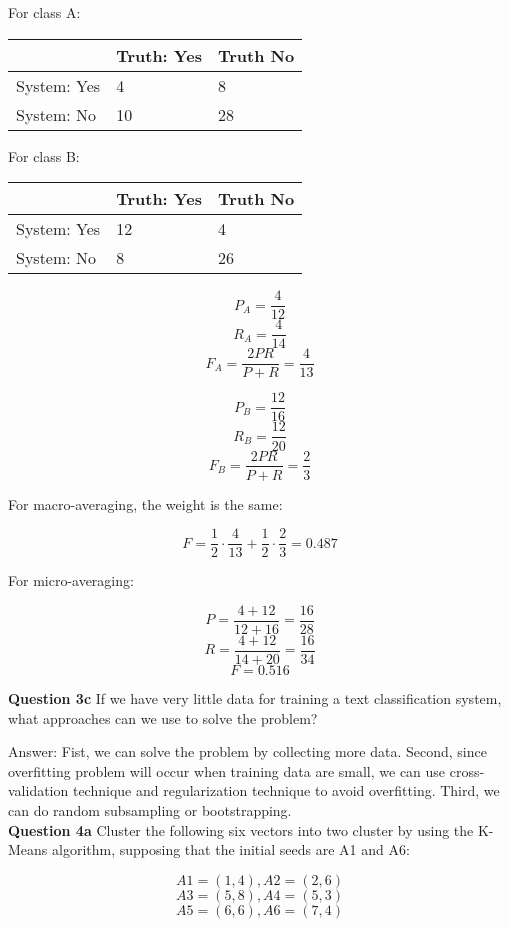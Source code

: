 \documentclass[11pt,a4paper]{report}
\begin{document}
\begin{multicols*}{2}
\noindent For class A:
\begin{center}
\begin{tabular}{| l | l | l |}
\hline
             & Truth: Yes & Truth No \\ \hline
System: Yes  & 4  & 8 \\ \hline
System: No   & 10 & 28\\ \hline
\end{tabular}
\end{center}

\noindent For class B:
\begin{center}
\begin{tabular}{| l | l | l |}
\hline
             & Truth: Yes & Truth No \\ \hline
System: Yes  & 12 & 4  \\ \hline
System: No   & 8  & 26 \\ \hline
\end{tabular}
\end{center}

$$P_A = \frac{4}{12}$$
$$R_A = \frac{4}{14}$$
$$F_A = \frac{2PR}{P+R} = \frac{4}{13}$$

$$P_B = \frac{12}{16}$$
$$R_B = \frac{12}{20}$$
$$F_B = \frac{2PR}{P+R} = \frac{2}{3}$$

\noindent For macro-averaging, the weight is the same:

$$F = \frac{1}{2} \cdot \frac{4}{13} + \frac{1}{2} \cdot \frac{2}{3} = 0.487$$

\noindent For micro-averaging:

$$P = \frac{4 + 12}{12 + 16} = \frac{16}{28}$$
$$R = \frac{4 + 12}{14 + 20} = \frac{16}{34}$$
$$F = 0.516$$

\noindent \textbf{Question 3c} If we have very little data for training a text classification system, what approaches can we use to solve the problem?

\noindent Answer: Fist, we can solve the problem by collecting more data. Second, since overfitting problem will occur when training data are small, we can use cross-validation technique and regularization technique to avoid overfitting. Third, we can do random subsampling or bootstrapping. \\

\noindent \textbf{Question 4a} Cluster the following six vectors into two cluster by using the K-Means algorithm, supposing that the initial seeds are A1 and A6:

$$A1=(1,4), A2=(2,6)$$
$$A3=(5,8), A4=(5,3)$$
$$A5=(6,6), A6=(7,4)$$


\end{multicols*}
\end{document}

